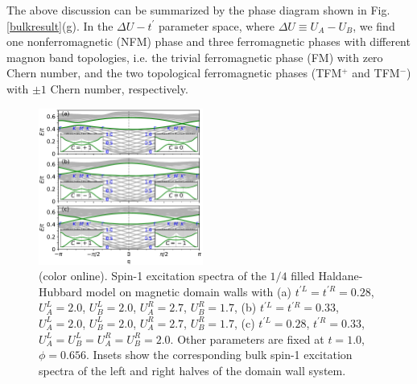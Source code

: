 \documentclass[amsmath,superscriptaddress,showpacs,aps,prl,twocolumn]{revtex4-1}
\begin{document}
\par The above discussion can be summarized by the phase diagram shown in Fig. \ref{bulkresult}(g). In the $\Delta U-t^\prime$ parameter space, where $\Delta U\equiv U_A-U_B$, we find one nonferromagnetic (NFM) phase and three ferromagnetic phases with different magnon band topologies, i.e. the trivial ferromagnetic phase (FM) with zero Chern number, and the two topological ferromagnetic phases (TFM$^+$ and TFM$^-$) with $\pm1$ Chern number, respectively.

\begin{figure}
\centering
\includegraphics[width=0.48\textwidth]{domainwallspectra}
\caption{(color online). Spin-1 excitation spectra of the $1/4$ filled Haldane-Hubbard model on magnetic domain walls with (a) $t^{\prime L}=t^{\prime R}=0.28$, $U^L_A=2.0$, $U^L_B=2.0$, $U^R_A=2.7$, $U^R_B=1.7$, (b) $t^{\prime L}=t^{\prime R}=0.33$, $U^L_A=2.0$, $U^L_B=2.0$, $U^R_A=2.7$, $U^R_B=1.7$, (c) $t^{\prime L}=0.28$, $t^{\prime R}=0.33$, $U^L_A=U^L_B=U^R_A=U^R_B=2.0$. Other parameters are fixed at $t=1.0$, $
\phi=0.656$. Insets show the corresponding bulk spin-1 excitation spectra of the left and right halves of the domain wall system.}
\label{domainwallspectra}
\end{figure}
\end{document}
